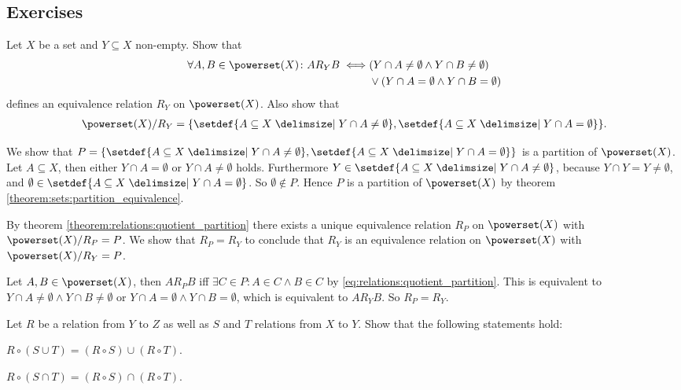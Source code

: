 \subsection{Exercises}

\begin{exercise}
    Let $X$ be a set and $Y\subseteq X$ non-empty. Show that \begin{align}\begin{split}\forall A,B\in\powerset(X)\colon A R_Y B\iff& (Y\cap A\neq\emptyset\land Y\cap B\neq\emptyset)\\&\lor (Y\cap A=\emptyset\land Y\cap B=\emptyset)\end{split}\end{align}
    defines an equivalence relation $R_Y$ on $\powerset(X)$. Also show that
    \begin{align}\powerset(X)/R_Y=\{\setdef{A\subseteq X\given Y\cap A\neq\emptyset},\setdef{A\subseteq X\given Y\cap A=\emptyset}\}.\end{align}
\end{exercise}

\begin{solution}
    We show that $P=\{\setdef{A\subseteq X\given Y\cap A\neq\emptyset},\setdef{A\subseteq X\given Y\cap A=\emptyset}\}$ is a partition of $\powerset(X)$. Let $A\subseteq X$, then either $Y\cap A=\emptyset$ or $Y\cap A\neq\emptyset$ holds. Furthermore $Y\in \setdef{A\subseteq X\given Y\cap A\neq\emptyset}$, because $Y\cap Y=Y\neq\emptyset$, and $\emptyset\in\setdef{A\subseteq X\given Y\cap A=\emptyset}$. So $\emptyset\notin P$. Hence $P$ is a partition of $\powerset(X)$ by theorem \ref{theorem:sets:partition_equivalence}.

    By theorem \ref{theorem:relations:quotient_partition} there exists a unique equivalence relation $R_P$ on $\powerset(X)$ with $\powerset(X)/R_P=P$. We show that $R_P=R_Y$ to conclude that $R_Y$ is an equivalence relation on $\powerset(X)$ with $\powerset(X)/R_Y=P$.

    Let $A,B\in\powerset(X)$, then $A R_P B$ iff $\exists C\in P\colon A\in C\land B\in C$ by \eqref{eq:relations:quotient_partition}. This is equivalent to $Y\cap A\neq\emptyset\land Y\cap B\neq\emptyset$ or $Y\cap A=\emptyset\land Y\cap B=\emptyset$, which is equivalent to $A R_Y B$. So $R_P=R_Y$.
\end{solution}


\begin{exercise}
    Let $R$ be a relation from $Y$ to $Z$ as well as $S$ and $T$ relations from $X$ to $Y$. Show that the following statements hold:
    \begin{intheoremenumerate}
        \item $R\circ(S\cup T)=(R\circ S)\cup(R\circ T)$.
        \item $R\circ(S\cap T)=(R\circ S)\cap(R\circ T)$.
    \end{intheoremenumerate}
\end{exercise}

